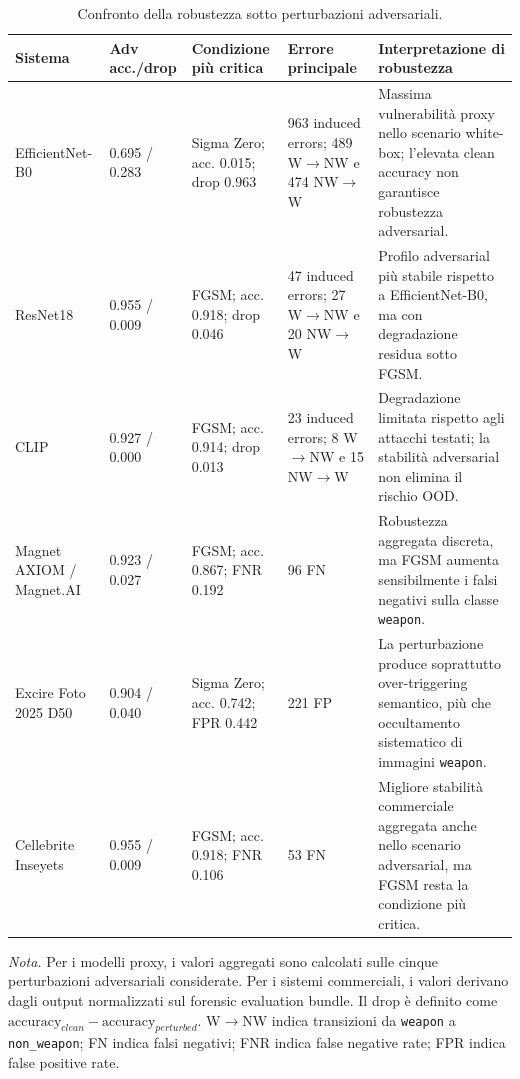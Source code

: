 \begin{table}[H]
\centering
\caption{Confronto della robustezza sotto perturbazioni adversariali.}
\label{tab:results-comparative-adversarial}
\small
\renewcommand{\arraystretch}{1.18}
\setlength{\tabcolsep}{3pt}
\begin{tabularx}{\textwidth}{@{}p{2.7cm} p{1.8cm} p{3.1cm} p{2.8cm} X@{}}
\toprule
\textbf{Sistema} &
\textbf{Adv acc./drop} &
\textbf{Condizione più critica} &
\textbf{Errore principale} &
\textbf{Interpretazione di robustezza} \\
\midrule

EfficientNet-B0 &
0.695 / 0.283 &
Sigma Zero; acc. 0.015; drop 0.963 &
963 induced errors; 489 W$\rightarrow$NW e 474 NW$\rightarrow$W &
Massima vulnerabilità proxy nello scenario white-box; l'elevata clean accuracy
non garantisce robustezza adversarial. \\

ResNet18 &
0.955 / 0.009 &
FGSM; acc. 0.918; drop 0.046 &
47 induced errors; 27 W$\rightarrow$NW e 20 NW$\rightarrow$W &
Profilo adversarial più stabile rispetto a EfficientNet-B0, ma con degradazione
residua sotto FGSM. \\

CLIP &
0.927 / 0.000 &
FGSM; acc. 0.914; drop 0.013 &
23 induced errors; 8 W$\rightarrow$NW e 15 NW$\rightarrow$W &
Degradazione limitata rispetto agli attacchi testati; la stabilità adversarial
non elimina il rischio OOD. \\

Magnet AXIOM / Magnet.AI &
0.923 / 0.027 &
FGSM; acc. 0.867; FNR 0.192 &
96 FN &
Robustezza aggregata discreta, ma FGSM aumenta sensibilmente i falsi negativi
sulla classe \texttt{weapon}. \\

Excire Foto 2025 D50 &
0.904 / 0.040 &
Sigma Zero; acc. 0.742; FPR 0.442 &
221 FP &
La perturbazione produce soprattutto over-triggering semantico, più che
occultamento sistematico di immagini \texttt{weapon}. \\

Cellebrite Inseyets &
0.955 / 0.009 &
FGSM; acc. 0.918; FNR 0.106 &
53 FN &
Migliore stabilità commerciale aggregata anche nello scenario adversarial, ma
FGSM resta la condizione più critica. \\

\bottomrule
\end{tabularx}

\vspace{0.4em}
\footnotesize
\textit{Nota.} Per i modelli proxy, i valori aggregati sono calcolati sulle
cinque perturbazioni adversariali considerate. Per i sistemi commerciali, i
valori derivano dagli output normalizzati sul forensic evaluation bundle. Il drop
è definito come
\(\text{accuracy}_{clean}-\text{accuracy}_{perturbed}\). W$\rightarrow$NW indica
transizioni da \texttt{weapon} a \texttt{non\_weapon}; FN indica falsi negativi;
FNR indica false negative rate; FPR indica false positive rate.
\end{table}

